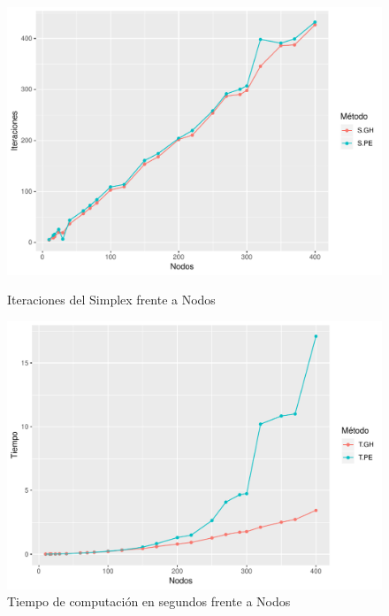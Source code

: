 \documentclass[twoside,a4paper,openright,12pt,tikz]{book}
\begin{document}
\begin{figure}[h!]
\centering
\includegraphics[scale=0.75]{plot2}
\caption{Iteraciones del Simplex frente a Nodos}
\includegraphics[scale=0.75]{plot3}
\caption{Tiempo de computación en segundos frente a Nodos}
\end{figure}
\end{document}

